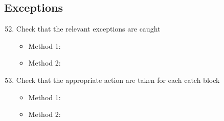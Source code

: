 \subsection{Exceptions}
\begin{enumerate}
	\setcounter{enumi}{51}
	\item Check that the relevant exceptions are caught
	\begin{itemize}
		\item Method 1: \cmark
		\item Method 2:
	\end{itemize}
	\item Check that the appropriate action are taken for each catch block
	\begin{itemize}
		\item Method 1: \cmark
		\item Method 2:
	\end{itemize}
\end{enumerate}